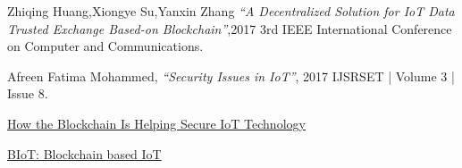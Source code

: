 
\begin{thebibliography}{99}



 Zhiqing Huang,Xiongye Su,Yanxin Zhang \textit{``A Decentralized Solution for IoT Data Trusted Exchange Based-on Blockchain''},2017 3rd IEEE International Conference on Computer and Communications.

 Afreen Fatima Mohammed, \textit{``Security Issues in IoT''}, 2017 IJSRSET | Volume 3 | Issue 8.
 
 \href{https://www.tripwire.com/state-of-security/security-awareness/blockchain-helping-secure-iot-technology/}{How the Blockchain Is Helping Secure IoT Technology}

 \href{https://medium.com/coinmonks/biot-blockchain-based-iot-bd913162b6d1}{BIoT: Blockchain based IoT}

\end{thebibliography}


